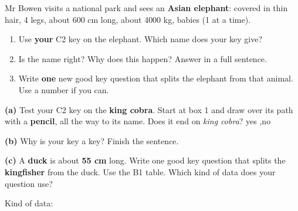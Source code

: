 \documentclass[12pt,a4paper]{article}
\newcommand{\qlines}[1]{\par\nobreak
  \noindent\begin{minipage}{\linewidth}\wlines{#1}\end{minipage}\par}
\begin{document}
\vfill
{}

\noindent\begin{minipage}{\textwidth}
\noindent Mr Bowen visits a national park and sees an \textbf{Asian elephant}:
covered in thin hair, 4 legs, about 600 cm long, about 4000 kg, babies (1 at a time).

\vspace{4pt}
\begin{enumerate}[label=(\alph*), itemsep=8pt, topsep=2pt]
  \item Use \textbf{your} C2 key on the elephant. Which name does your key give?
        \ \blank[3.4cm]
  \item Is the name right? Why does this happen? Answer in a full sentence.
        \qlines{3}
  \item Write \textbf{one} new good key question that splits the elephant from that
        animal. Use a number if you can.
        \qlines{2}
\end{enumerate}
\end{minipage}

\clearpage
{}

\noindent\begin{minipage}{\textwidth}
\noindent\textbf{(a)} Test your C2 key on the \textbf{king cobra}. Start at box 1 and
draw over its path with a \textbf{pencil}, all the way to its name. Does it end on
\emph{king cobra}? \quad yes \sep no
\end{minipage}

\vspace{12pt}
\noindent\begin{minipage}{\textwidth}
\noindent\textbf{(b)} Why is your key a  key? Finish the sentence. \\[3pt]
\qlines{3}
\end{minipage}

\vspace{10pt}
\noindent\begin{minipage}{\textwidth}
\noindent\textbf{(c)} A \textbf{duck} is about \textbf{55 cm} long. Write one good key
question that splits the \textbf{kingfisher} from the duck. Use the B1 table. Which kind of
data does your question use?
\qlines{2}
\noindent Kind of data: \blank[4.0cm]
\end{minipage}
\end{document}
